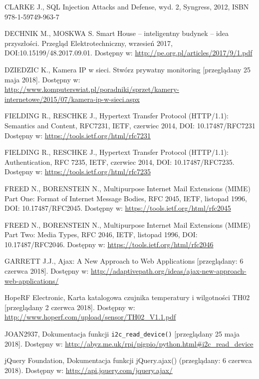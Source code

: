 \documentclass[a4paper,11pt,twoside]{article}
\begin{document}
\begin{thebibliography}{9}
\uppercase{Clarke J.}, SQL Injection Attacks and Defense, wyd. 2, Syngress, 2012, ISBN 978-1-59749-963-7  

DECHNIK M., MOSKWA S. Smart House – inteligentny budynek – idea przyszłości. Przegląd Elektrotechniczny, wrzesień 2017, DOI:10.15199/48.2017.09.01.
Dostępny w: \url{http://pe.org.pl/articles/2017/9/1.pdf}

\uppercase{Dziedzic K.}, Kamera IP w sieci. Stwórz prywatny monitoring [przeglądany 25 maja 2018].
Dostępny w: \url{http://www.komputerswiat.pl/poradniki/sprzet/kamery-internetowe/2015/07/kamera-ip-w-sieci.aspx}

\uppercase{Fielding R., Reschke J.}, Hypertext Transfer Protocol (HTTP/1.1): Semantics and Content, RFC7231, IETF, czerwiec 2014, DOI: 10.17487/RFC7231
Dostępny w: \url{https://tools.ietf.org/html/rfc7231}

\uppercase{Fielding R., Reschke J.}, Hypertext Transfer Protocol (HTTP/1.1): Authentication, RFC 7235, IETF, czerwiec 2014, DOI: 10.17487/RFC7235.
Dostępny w: \url{https://tools.ietf.org/html/rfc7235}

\uppercase{Freed N., Borenstein N.}, Multipurpose Internet Mail Extensions (MIME) Part One: Format of Internet Message Bodies, RFC 2045, IETF, listopad 1996, DOI: 10.17487/RFC2045.
Dostępny w: \url{https://tools.ietf.org/html/rfc2045}

\uppercase{Freed N., Borenstein N.}, Multipurpose Internet Mail Extensions (MIME) Part Two: Media Types, RFC 2046, IETF, listopad 1996, DOI: 10.17487/RFC2046.
Dostępny w: \url{https://tools.ietf.org/html/rfc2046}

GARRETT J.J., Ajax: A New Approach to Web Applications [przeglądany: 6 czerwca 2018]. Dostępny w: \url{http://adaptivepath.org/ideas/ajax-new-approach-web-applications/}

HopeRF Electronic, Karta katalogowa czujnika temperatury i wilgotności TH02 [przeglądany 2 czerwca 2018].
Dostępny w: \url{http://www.hoperf.com/upload/sensor/TH02_V1.1.pdf}

\uppercase{joan2937}, Dokumentacja funkcji \texttt{i2c{\_}read{\_}device()} [przeglądany 25 maja 2018].
Dostępny w: \url{http://abyz.me.uk/rpi/pigpio/python.html#i2c_read_device}

jQuery Foundation, Dokumentacja funkcji jQuery.ajax() (przeglądany: 6 czerwca 2018). Dostępny w: \url{http://api.jquery.com/jquery.ajax/}


\end{thebibliography}
\end{document}
